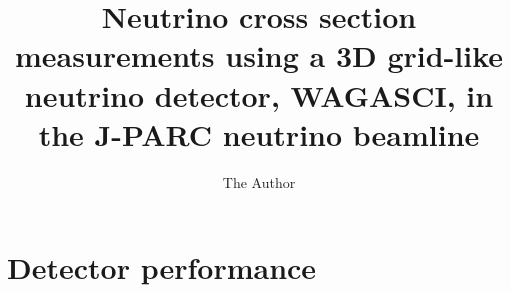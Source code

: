 \documentclass[11pt, oneside]{article}   	%
\title{Neutrino cross section measurements using a 3D grid-like neutrino detector, WAGASCI, in the J-PARC neutrino beamline}
\author{The Author}
\begin{document}
\maketitle








\section{Detector performance}




%



\end{document}
